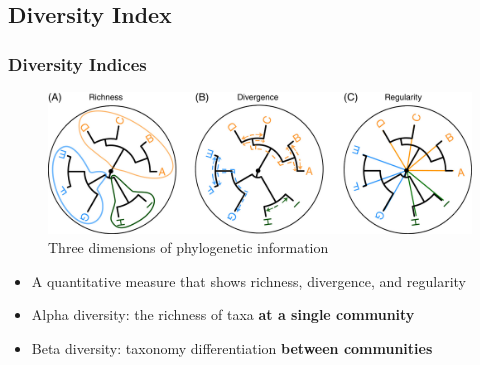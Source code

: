 \documentclass{beamer}
\begin{document}
    \subsection{Diversity Index}
    \begin{frame}
        \frametitle{Diversity Indices}

        \begin{figure}
            \includegraphics[width=0.6 \linewidth]{figures/phylogenic.jpg}
            \caption{Three dimensions of phylogenetic information \protect\cite{phylogenetic1}}
        \end{figure}

        \begin{itemize}
            \item A quantitative measure that shows richness, divergence, and regularity \cite{phylogenetic1}
            \item Alpha diversity: the richness of taxa \textbf{at a single community}
            \item Beta diversity: taxonomy differentiation \textbf{between communities}
        \end{itemize}
    \end{frame}
\end{document}
